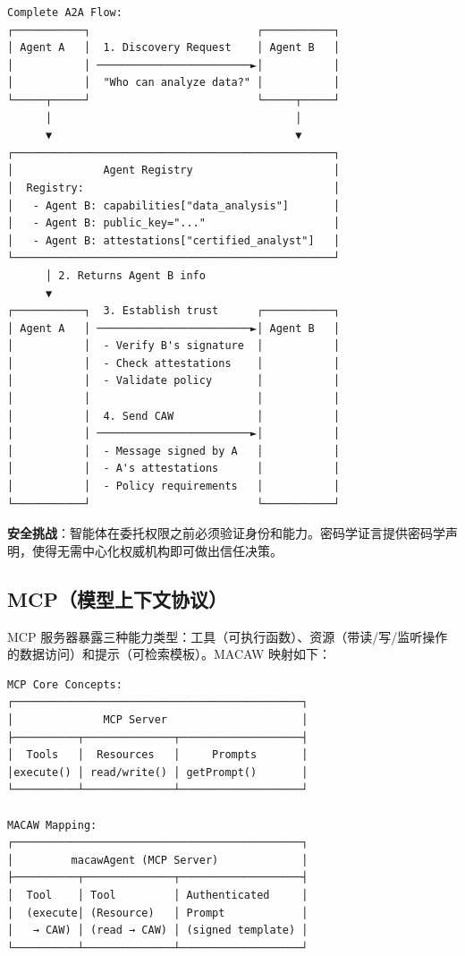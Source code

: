 {{\begin{verbatim}
Complete A2A Flow:
┌───────────┐                          ┌───────────┐
│ Agent A   │  1. Discovery Request    │ Agent B   │
│           │ ────────────────────────►│           │
│           │  "Who can analyze data?" │           │
└─────┬─────┘                          └─────┬─────┘
      │                                      │
      ▼                                      ▼
┌──────────────────────────────────────────────────┐
│              Agent Registry                      │
│  Registry:                                       │
│   - Agent B: capabilities["data_analysis"]       │
│   - Agent B: public_key="..."                    │
│   - Agent B: attestations["certified_analyst"]   │
└──────────────────────────────────────────────────┘
      │ 2. Returns Agent B info
      ▼
┌───────────┐  3. Establish trust      ┌───────────┐
│ Agent A   │ ────────────────────────►│ Agent B   │
│           │  - Verify B's signature  │           │
│           │  - Check attestations    │           │
│           │  - Validate policy       │           │
│           │                          │           │
│           │  4. Send CAW             │           │
│           │ ────────────────────────►│           │
│           │  - Message signed by A   │           │
│           │  - A's attestations      │           │
│           │  - Policy requirements   │           │
└───────────┘                          └───────────┘
\end{verbatim}}

\textbf{安全挑战}：智能体在委托权限之前必须验证身份和能力。密码学证言提供密码学声明，使得无需中心化权威机构即可做出信任决策。

\subsection*{MCP（模型上下文协议）}

MCP 服务器暴露三种能力类型：工具（可执行函数）、资源（带读/写/监听操作的数据访问）和提示（可检索模板）。MACAW 映射如下：

{\tiny
\begin{verbatim}
MCP Core Concepts:
┌─────────────────────────────────────────────┐
│              MCP Server                     │
├──────────┬──────────────┬───────────────────┤
│  Tools   │  Resources   │     Prompts       │
│execute() │ read/write() │ getPrompt()       │
└──────────┴──────────────┴───────────────────┘

MACAW Mapping:
┌─────────────────────────────────────────────┐
│         macawAgent (MCP Server)             │
├──────────┬──────────────┬───────────────────┤
│  Tool    │ Tool         │ Authenticated     │
│  (execute│ (Resource)   │ Prompt            │
│   → CAW) │ (read → CAW) │ (signed template) │
└──────────┴──────────────┴───────────────────┘


\end{verbatim}}}
